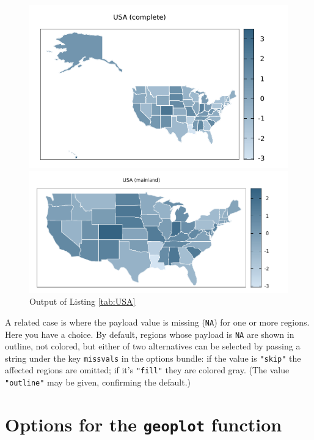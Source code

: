 \documentclass{article}
\begin{document}
\begin{figure}[p]
  \begin{center}
  \includegraphics[scale=0.9]{us0.pdf}

  \includegraphics[scale=0.9]{us1.pdf}
\end{center}
\caption{Output of Listing \ref{tab:USA}}
\label{fig:USA}
\end{figure}

A related case is where the payload value is missing (\texttt{NA}) for
one or more regions. Here you have a choice. By default, regions whose
payload is \texttt{NA} are shown in outline, not colored, but either
of two alternatives can be selected by passing a string under the key
\texttt{missvals} in the options bundle: if the value is \verb|"skip"|
the affected regions are omitted; if it's \verb|"fill"| they are
colored gray. (The value \verb|"outline"| may be given, confirming the
default.)

\section{Options for the \texttt{geoplot} function}
\label{sec:opts}
\end{document}
